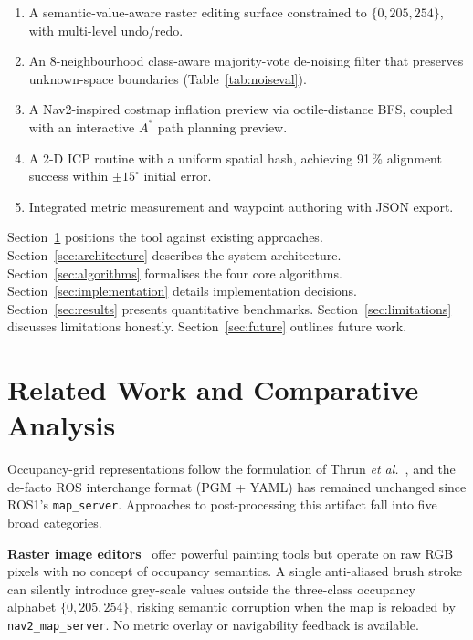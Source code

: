 \documentclass[journal]{IEEEtran}
\begin{document}
\begin{enumerate}
  \setlength{\itemsep}{0pt}\setlength{\parskip}{0pt}
  \item A semantic-value-aware raster editing surface constrained to $\{0,205,254\}$, with multi-level undo/redo.
  \item An 8-neighbourhood class-aware majority-vote de-noising filter that preserves unknown-space boundaries (Table~\ref{tab:noiseval}).
  \item A Nav2-inspired costmap inflation preview via octile-distance BFS, coupled with an interactive $A^{*}$ path planning preview.
  \item A 2-D ICP routine with a uniform spatial hash, achieving 91\,\% alignment success within $\pm15^{\circ}$ initial error.
  \item Integrated metric measurement and waypoint authoring with JSON export.
\end{enumerate}

Section~\ref{sec:related} positions the tool against existing approaches.
Section~\ref{sec:architecture} describes the system architecture.
Section~\ref{sec:algorithms} formalises the four core algorithms.
Section~\ref{sec:implementation} details implementation decisions.
Section~\ref{sec:results} presents quantitative benchmarks.
Section~\ref{sec:limitations} discusses limitations honestly.
Section~\ref{sec:future} outlines future work.

\section{Related Work and Comparative Analysis}
\label{sec:related}

Occupancy-grid representations follow the formulation of Thrun \emph{et al.}\
\cite{thrun2005probabilistic}, and the de-facto ROS interchange format (PGM +
YAML) has remained unchanged since ROS1's \texttt{map\_server}.  Approaches
to post-processing this artifact fall into five broad categories.

\textbf{Raster image editors}~\cite{gimp} offer powerful painting tools but
operate on raw RGB pixels with no concept of occupancy semantics.  A single
anti-aliased brush stroke can silently introduce grey-scale values outside the
three-class occupancy alphabet $\{0,205,254\}$, risking semantic corruption
when the map is reloaded by \texttt{nav2\_map\_server}.  No metric overlay or
navigability feedback is available.
\end{document}
